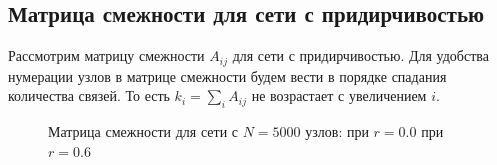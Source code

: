 \documentclass[10pt,aps,pra]{revtex4-1}
\begin{document}


\subsection{Матрица смежности для сети с придирчивостью}
Рассмотрим матрицу смежности $A_{ij}$ для сети с придирчивостью. Для удобства нумерации узлов в матрице смежности будем вести в порядке спадания количества связей. То есть $k_i=\sum\limits_{i}A_{ij}$ не возрастает с увеличением $i$.


\begin{figure}[H]  

\centering
{}  

\caption{
\label{fig:baRankedMatrix}
Матрица смежности для сети с $N=5000$ узлов:
  при $r=0.0$
 при $r=0.6$
}
\end{figure}
\end{document}
